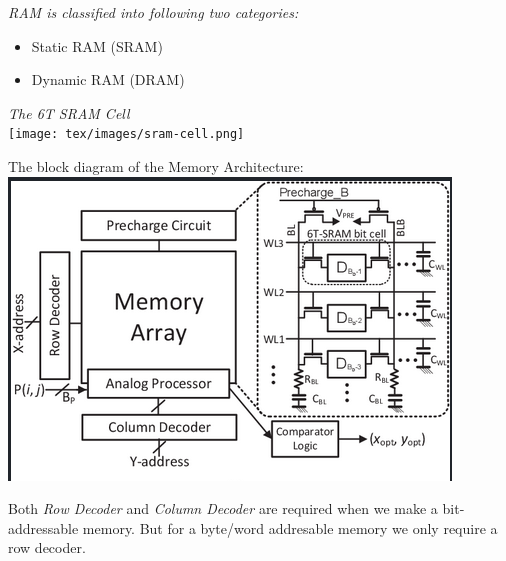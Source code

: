\documentclass[12pt, letterpaper]{article}
\begin{document}
\emph{RAM is classified into following two categories:}
\begin{itemize}
    \item Static RAM (SRAM)
    \item Dynamic RAM (DRAM)
\end{itemize}

\emph{The 6T SRAM Cell} \\
\texttt{[image: tex/images/sram-cell.png]}

The block diagram of the Memory Architecture: \\
\includegraphics[scale=0.7]{tex/images/det_mem_arch.png}

Both \emph{Row Decoder} and \emph{Column Decoder} are required when we make a bit-addressable memory.
But for a byte/word addresable memory we only require a row decoder.
\end{document}
